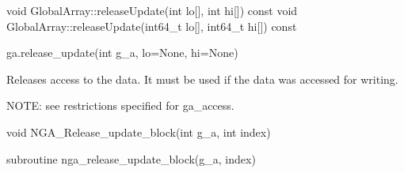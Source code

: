 \documentclass[12pt]{article}
\begin{document}
\begin{cxxapi}
\begin{cxxcode}
void GlobalArray::releaseUpdate(int lo[], int hi[]) const
void GlobalArray::releaseUpdate(int64_t lo[], int64_t hi[]) const
\end{cxxcode}
\begin{funcargs}
\end{funcargs}
\end{cxxapi}

\begin{pyapi}
\begin{pycode}
ga.release_update(int g_a, lo=None, hi=None)
\end{pycode}
\begin{funcargs}
\end{funcargs}
\end{pyapi}

\local

\begin{desc}

Releases access to the data. It must be used if the data was accessed for
writing.

NOTE: see restrictions specified for ga_access.

\end{desc}



\begin{capi}
\begin{ccode}
void NGA_Release_update_block(int g_a, int index)
\end{ccode}
\begin{funcargs}
\end{funcargs}
\end{capi}

\begin{fapi}
\begin{fcode}
subroutine nga_release_update_block(g_a, index)
\end{fcode}
\begin{funcargs}
\end{funcargs}
\end{fapi}
\end{document}

